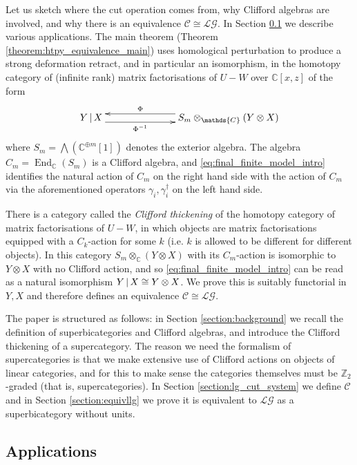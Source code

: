\documentclass[english,letter paper,12pt,leqno]{article}
\theoremstyle{example}
\numberwithin{equation}{section}
\def\LG{\mathcal{LG}}
\def\nZ{\mathds{Z}}
\def\nC{\mathds{C}}
\def\L{\mathcal{C}}
\def\ferm{\gamma}
\def\fermc{\gamma^\dagger}
\DeclareMathOperator{\End}{End}
\begin{document}
Let us sketch where the cut operation comes from, why Clifford algebras are involved, and why there is an equivalence $\L \cong \LG$. In Section \ref{section:intro_appli} we describe various applications. The main theorem (Theorem \ref{theorem:htpy_equivalence_main}) uses homological perturbation to produce a strong deformation retract, and in particular an isomorphism, in the homotopy category of (infinite rank) matrix factorisations of $U - W$ over $\nC[x,z]$ of the form
\begin{equation}\label{eq:final_finite_model_intro}
\xymatrix@C+4pc{
Y \l X \ar@<-1ex>[r]_-{\Phi^{-1}} & S_m \otimes_{\nC} ( Y \otimes X )\ar@<-1ex>[l]_-{\Phi}
}
\end{equation}
where $S_m = \bigwedge ( \nC^{\oplus m}[1] )$ denotes the exterior algebra. The algebra $C_m = \End_{\nC}(S_m)$ is a Clifford algebra, and \eqref{eq:final_finite_model_intro} identifies the natural action of $C_m$ on the right hand side with the action of $C_m$ via the aforementioned operators $\ferm_i, \fermc_i$ on the left hand side.

There is a category called the \emph{Clifford thickening} of the homotopy category of matrix factorisations of $U - W$, in which objects are matrix factorisations equipped with a $C_k$-action for some $k$ (i.e. $k$ is allowed to be different for different objects). In this category $S_m \otimes_{\nC} ( Y \otimes X )$ with its $C_m$-action is isomorphic to $Y \otimes X$ with no Clifford action, and so \eqref{eq:final_finite_model_intro} can be read as a natural isomorphism $Y \,|\, X \cong Y \otimes X$. We prove this is suitably functorial in $Y,X$ and therefore defines an equivalence $\L \cong \LG$.

\vspace{0.5cm}

The paper is structured as follows: in Section \ref{section:background} we recall the definition of superbicategories and Clifford algebras, and introduce the Clifford thickening of a supercategory. The reason we need the formalism of supercategories is that we make extensive use of Clifford actions on objects of linear categories, and for this to make sense the categories themselves must be $\nZ_2$-graded (that is, supercategories). In Section \ref{section:lg_cut_system} we define $\L$ and in Section \ref{section:equivllg} we prove it is equivalent to $\LG$ as a superbicategory without units. 

\subsection{Applications}\label{section:intro_appli}
\end{document}
